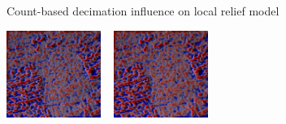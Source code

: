\documentclass[xcolor={dvipsnames,usenames},beamer,aspectratio=1610]{beamer}
\begin{document}
\begin{frame}{Count-based decimation influence on local relief model}

\newcommand{\imgsize}{0.23\textwidth}

\centering
\includegraphics[width=\imgsize]{uav_all_lrm_shaded}%
~%
\includegraphics[width=\imgsize]{uav_skip_5_lrm_shaded}%

\end{frame}
\end{document}
